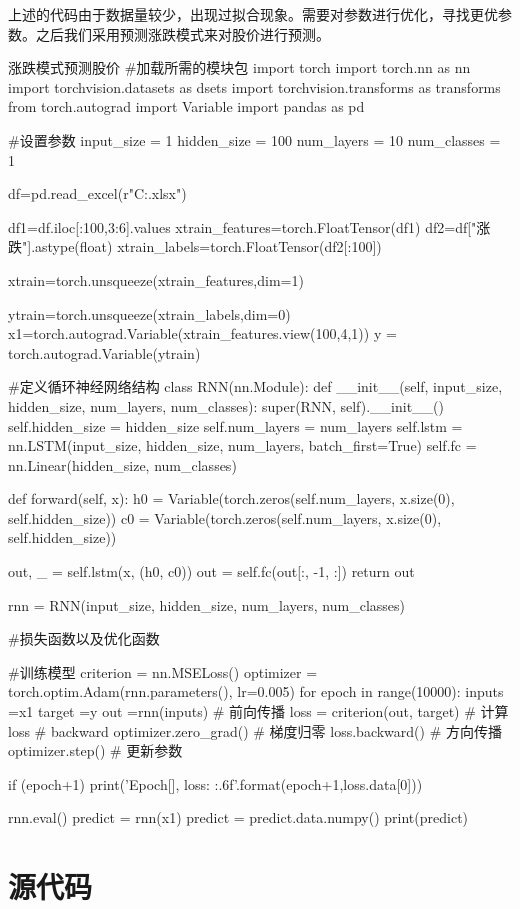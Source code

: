 \documentclass[openbib]{article}
\begin{document}
上述的代码由于数据量较少，出现过拟合现象。需要对参数进行优化，寻找更优参数。之后我们采用预测涨跌模式来对股价进行预测。
\begin{Python}{涨跌模式预测股价}
#加载所需的模块包
import torch
import torch.nn as nn
import torchvision.datasets as dsets
import torchvision.transforms as transforms
from torch.autograd import Variable
import pandas as pd

#设置参数
input_size = 1
hidden_size = 100
num_layers = 10
num_classes = 1

df=pd.read_excel(r"C:\Users\yjb\Desktop\stock.xlsx")

df1=df.iloc[:100,3:6].values
xtrain_features=torch.FloatTensor(df1)
df2=df["涨跌"].astype(float)
xtrain_labels=torch.FloatTensor(df2[:100])

xtrain=torch.unsqueeze(xtrain_features,dim=1)

ytrain=torch.unsqueeze(xtrain_labels,dim=0)
x1=torch.autograd.Variable(xtrain_features.view(100,4,1))
y = torch.autograd.Variable(ytrain)

#定义循环神经网络结构
class RNN(nn.Module):
	def __init__(self, input_size, hidden_size, num_layers, num_classes):
		super(RNN, self).__init__()
		self.hidden_size = hidden_size
		self.num_layers = num_layers
		self.lstm = nn.LSTM(input_size, hidden_size, num_layers, batch_first=True)
		self.fc = nn.Linear(hidden_size, num_classes)

	def forward(self, x):
		h0 = Variable(torch.zeros(self.num_layers, x.size(0), self.hidden_size))
		c0 = Variable(torch.zeros(self.num_layers, x.size(0), self.hidden_size))
		
		
		out, _ = self.lstm(x, (h0, c0))
		out = self.fc(out[:, -1, :])
		return out

rnn = RNN(input_size, hidden_size, num_layers, num_classes)

#损失函数以及优化函数


#训练模型
criterion = nn.MSELoss()
optimizer = torch.optim.Adam(rnn.parameters(), lr=0.005)
for epoch in range(10000):
	inputs =x1
	target =y
	out =rnn(inputs) # 前向传播
	loss = criterion(out, target) # 计算loss
	# backward
	optimizer.zero_grad() # 梯度归零
	loss.backward() # 方向传播
	optimizer.step() # 更新参数
	
	if (epoch+1) %
	print('Epoch[{}], loss: {:.6f}'.format(epoch+1,loss.data[0]))

rnn.eval()
predict = rnn(x1)
predict = predict.data.numpy()
print(predict)
\end{Python}
\section{源代码}
\end{document}

